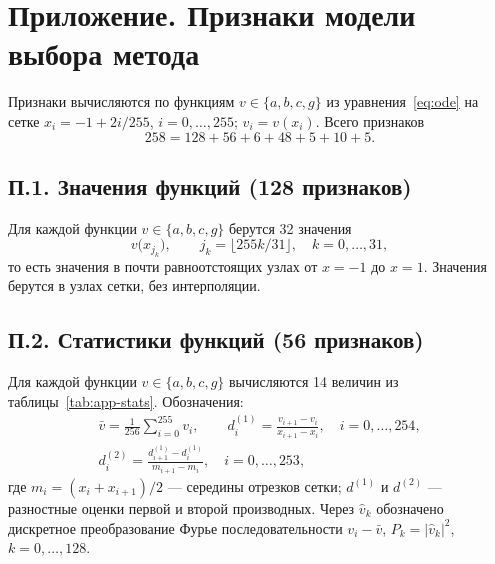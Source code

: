 \documentclass[14pt,a4paper]{extarticle}
\begin{document}
\clearpage
\section*{Приложение. Признаки модели выбора метода}
{}

Признаки вычисляются по функциям $v\in\{a,b,c,g\}$ из
уравнения~\eqref{eq:ode} на сетке $x_i=-1+2i/255$, $i=0,\dots,255$;
$v_i=v(x_i)$. Всего признаков
\[
258=128+56+6+48+5+10+5.
\]

\subsection*{П.1. Значения функций (128 признаков)}
Для каждой функции $v\in\{a,b,c,g\}$ берутся 32 значения
\[
v\bigl(x_{j_k}\bigr),\qquad j_k=\lfloor 255k/31\rfloor,\quad k=0,\dots,31,
\]
то есть значения в почти равноотстоящих узлах от $x=-1$ до $x=1$.
Значения берутся в узлах сетки, без интерполяции.

\subsection*{П.2. Статистики функций (56 признаков)}
Для каждой функции $v\in\{a,b,c,g\}$ вычисляются 14 величин из
таблицы~\ref{tab:app-stats}. Обозначения:
\begin{gather*}
\bar v=\frac1{256}\sum_{i=0}^{255}v_i,\qquad
d^{(1)}_i=\frac{v_{i+1}-v_i}{x_{i+1}-x_i},\quad i=0,\dots,254,\\
d^{(2)}_i=\frac{d^{(1)}_{i+1}-d^{(1)}_i}{m_{i+1}-m_i},\quad i=0,\dots,253,
\end{gather*}
где $m_i=(x_i+x_{i+1})/2$ --- середины отрезков сетки;
$d^{(1)}$ и $d^{(2)}$ --- разностные оценки первой и второй производных.
Через $\hat v_k$ обозначено дискретное преобразование Фурье
последовательности $v_i-\bar v$, $P_k=|\hat v_k|^2$, $k=0,\dots,128$.
\end{document}
